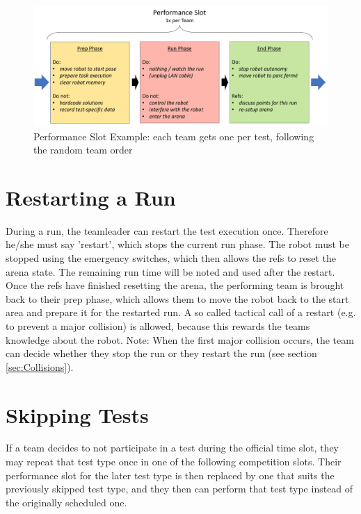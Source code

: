 \begin{figure} [h!]
	\begin{center}
		\includegraphics[width= 0.9\linewidth]{./images/competition/performance_slot}
	\end{center}
	\caption{Performance Slot Example: each team gets one per test, following the random team order}
	\label{fig:performance slot example}
\end{figure}



\section{Restarting a Run}
\label{sec:restartingarun}

During a run, the teamleader can restart the test execution once.
Therefore he/she must say 'restart', which stops the current run phase. The robot must be stopped using the emergency switches, which then allows the refs to reset the arena state.
The remaining run time will be noted and used after the restart. Once the refs have finished resetting the arena, the performing team is brought back to their prep phase, which allows them to move the robot back to the start area and prepare it for the restarted run.
A so called tactical call of a restart (e.g. to prevent a major collision) is allowed, because this rewards the teams knowledge about the robot.
Note: When the first major collision occurs, the team can decide whether they stop the run or they restart the run (see section \ref{sec:Collisions}).


\section{Skipping Tests}

If a team decides to not participate in a test during the official time slot, 
they may repeat that test type once in one of the following competition slots.
Their performance slot for the later test type is then replaced by one that suits the previously skipped test type, 
and they then can perform that test type instead of the originally scheduled one.

